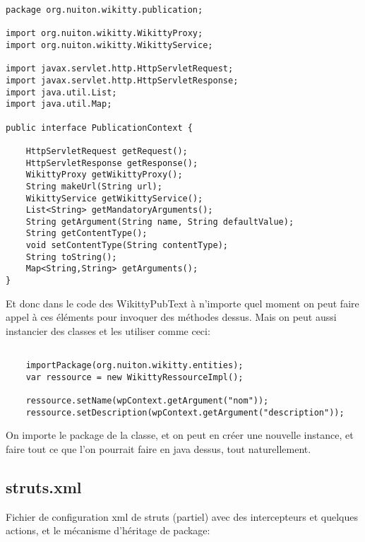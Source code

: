 \begin{lstlisting}
package org.nuiton.wikitty.publication;

import org.nuiton.wikitty.WikittyProxy;
import org.nuiton.wikitty.WikittyService;

import javax.servlet.http.HttpServletRequest;
import javax.servlet.http.HttpServletResponse;
import java.util.List;
import java.util.Map;

public interface PublicationContext {

    HttpServletRequest getRequest();
    HttpServletResponse getResponse();
    WikittyProxy getWikittyProxy();
    String makeUrl(String url);
    WikittyService getWikittyService();
    List<String> getMandatoryArguments();
    String getArgument(String name, String defaultValue);
    String getContentType();
    void setContentType(String contentType);
    String toString();
    Map<String,String> getArguments();
}

\end{lstlisting}

Et donc dans le code des WikittyPubText à n'importe quel moment on peut faire 
appel à ces éléments pour invoquer des méthodes dessus. Mais on peut aussi
instancier des classes et les utiliser comme ceci:

\begin{lstlisting}

	importPackage(org.nuiton.wikitty.entities);
	var ressource = new WikittyRessourceImpl();

	ressource.setName(wpContext.getArgument("nom"));
	ressource.setDescription(wpContext.getArgument("description"));
\end{lstlisting}

On importe le package de la classe, et on peut en créer une nouvelle instance, 
et faire tout ce que l'on pourrait faire en java dessus, tout naturellement.
\clearpage

\subsection*{struts.xml}

Fichier de configuration xml de struts (partiel) avec des intercepteurs et quelques
actions, et le mécanisme d'héritage de package:

